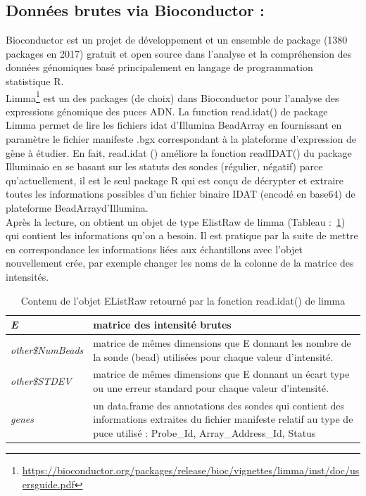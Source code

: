 \documentclass[a4paper,10pt]{article}
\begin{document}
\subsection{ Données brutes via Bioconductor :}
Bioconductor est un projet de développement et un ensemble de package (1380 packages en 2017)  gratuit et open source dans l’analyse et la compréhension des données génomiques basé principalement en langage de programmation statistique R.
\\Limma\footnote{\url{https://bioconductor.org/packages/release/bioc/vignettes/limma/inst/doc/usersguide.pdf}} est un des packages (de choix) dans Bioconductor pour l’analyse des expressions génomique des puces  ADN. La function read.idat() de package Limma permet de lire les fichiers idat d’Illumina BeadArray en fournissant en paramètre le fichier manifeste .bgx correspondant à la plateforme d’expression de gène à étudier.
En fait, read.idat () améliore la fonction readIDAT() du package Illuminaio\cite{smith2013illuminaio} en se basant sur les statuts des sondes (régulier, négatif) parce qu’actuellement, il est le seul package R qui est conçu de décrypter et extraire toutes les informations possibles d’un fichier binaire IDAT (encodé en base64) de plateforme BeadArrayd’Illumina.
\\Après la lecture, on obtient un objet de type ElistRaw de limma (Tableau :~\ref{EListRaw}) qui contient les informations qu’on a besoin. 
Il est pratique par la suite de mettre en correspondance les informations liées aux échantillons avec l’objet nouvellement crée, par exemple changer les noms de la colonne de la matrice des intensités.
\begin{table}[!ht]
\begin{tabular}{|p{3cm}|p{9cm}|}
\hline
 \emph{E} & matrice des intensité brutes\\
\hline
\emph{other\$NumBeads }   &  matrice de mêmes dimensions que E donnant les nombre de la sonde (bead) utilisées pour chaque valeur d'intensité. \\
\hline 
\emph{other\$STDEV} & matrice de mêmes dimensions que E donnant un écart type ou une erreur standard pour chaque valeur d'intensité.\\
\hline
\emph{genes} & un data.frame des annotations des sondes qui contient des informations extraites du fichier manifeste relatif au type de puce utilisé : Probe\_Id, Array\_Address\_Id, Status
\\
\hline
\end{tabular}
\caption{Contenu de l'objet EListRaw retourné par la fonction read.idat() de limma}
\label{EListRaw}
\end{table}
\end{document}
